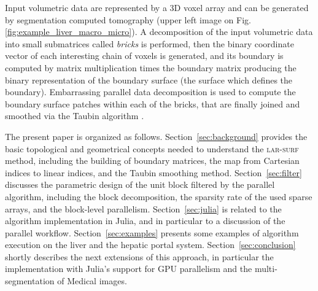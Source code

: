 Input volumetric data are represented by a 3D voxel array and can be generated by segmentation computed tomography (upper left image on Fig. \ref{fig:example_liver_macro_micro}). A decomposition of the input volumetric data into small submatrices called \emph{bricks} is performed, then the binary coordinate vector of each interesting chain of voxels is generated, and its boundary is computed by matrix multiplication times the boundary matrix producing the binary representation of the boundary surface (the surface which defines the boundary). 
Embarrassing parallel data decomposition is used to compute the boundary surface patches within each of the bricks, that are finally joined and smoothed via the Taubin algorithm \cite{Taubin1995}.

The present paper is organized as follows.
Section~\ref{sec:background} provides the basic topological and geometrical concepts needed to understand the \textsc{lar-surf} method, including the building of boundary matrices, the map from Cartesian indices to linear indices, and the Taubin smoothing method.
Section~\ref{sec:filter} discusses the parametric design of the unit block filtered by the parallel algorithm, including the block decomposition, the sparsity rate of the used sparse arrays, and the block-level parallelism.
Section~\ref{sec:julia} is related to the algorithm implementation in Julia, and in particular to a discussion of the parallel workflow.
Section~\ref{sec:examples} presents some examples of algorithm execution on the liver and the hepatic portal system.
Section~\ref{sec:conclusion} shortly describes the next extensions of this approach, in particular the implementation with Julia's support for GPU parallelism and the multi-segmentation of Medical images.
